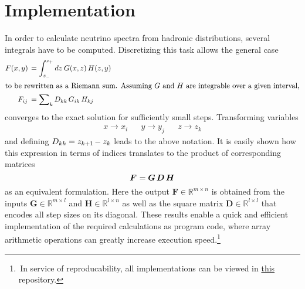 \newpage



\section{Implementation}
\label{sec:implementation}

In order to calculate neutrino spectra from hadronic distributions, several integrals have to be computed. Discretizing
this task allows the general case
\begin{align*}
	F(x, y) \kern+1.5pt &= \int_{z_{-}}^{z_{+}} dz \: G(x, z) \, H(z, y) \\
	\intertext{to be rewritten as a Riemann sum. Assuming $G$ and $H$ are integrable over a given interval,}
	F_{ij} \kern+1.8pt &= \sum\nolimits_k D_{kk} \, G_{ik} \, H_{kj}
\end{align*}
converges to the exact solution for sufficiently small steps. Transforming variables
\begin{align*}
	&&&& x \rightarrow x_i && y \rightarrow y_j && z \rightarrow z_k &&&&
\end{align*}
and defining $D_{kk} = z_{k+1} \kern-1.0pt - z_k$ leads to the above notation. It is easily shown how this expression in terms of
indices translates to the product of corresponding matrices
\begin{equation*}
	\bm{F} \kern+0.6pt = \bm{G} \, \bm{D} \, \bm{H}
\end{equation*}
as an equivalent formulation. Here the output $\bm{F} \in \mathbb{R}^{m \times n}$ is obtained from the inputs
$\bm{G} \in \mathbb{R}^{m \times l}$ and $\bm{H} \in \mathbb{R}^{l \times n}$ as well as the square matrix
$\bm{D} \in \mathbb{R}^{l \times l}$ that encodes all step sizes on its diagonal. These results enable a quick and
efficient implementation of the required calculations as program code, where array arithmetic operations can greatly
increase execution speed.\footnote{$\,$In service of reproducability, all implementations can be viewed in
\href{https://github.com/fritzali/bachelor}{this} repository.}
